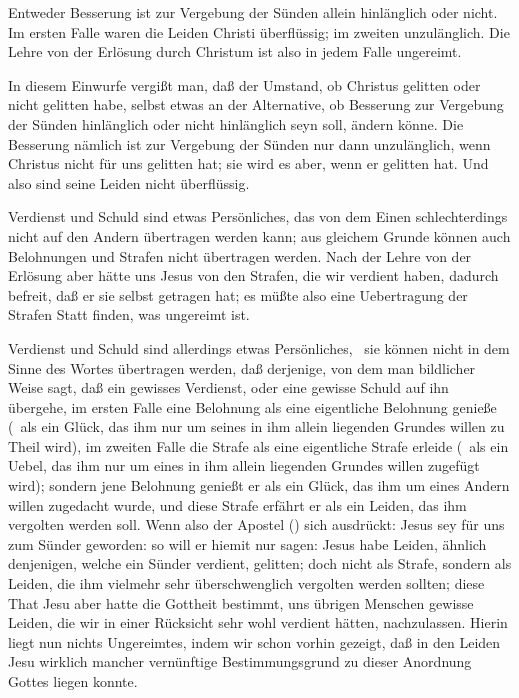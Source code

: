 \begin{aufza}
\begin{aufzb}
\begin{aufzc}
\end{aufzc}
\end{aufzb}
 Entweder Besserung ist zur Vergebung der Sünden allein hinlänglich oder nicht. Im ersten Falle waren die Leiden Christi überflüssig; im zweiten unzulänglich. Die Lehre von der Erlösung durch Christum ist also in jedem Falle ungereimt.\par
{} In diesem Einwurfe vergißt man, daß der Umstand, ob Christus gelitten oder nicht gelitten habe, selbst etwas an der Alternative, ob Besserung zur Vergebung der Sünden hinlänglich oder nicht hinlänglich seyn soll, ändern könne. Die Besserung nämlich ist zur Vergebung der Sünden nur dann unzulänglich, wenn Christus nicht für uns gelitten hat; sie wird es aber, wenn er gelitten hat. Und also sind seine Leiden nicht überflüssig.\par
{} Verdienst und Schuld sind etwas Persönliches, das von dem Einen schlechterdings nicht auf den Andern übertragen werden kann; aus gleichem Grunde können auch Belohnungen und Strafen nicht übertragen werden. Nach der Lehre von der Erlösung aber hätte uns Jesus von den Strafen, die wir verdient haben, dadurch befreit, daß er sie selbst getragen hat; es müßte also eine Uebertragung der Strafen Statt finden, was ungereimt ist.\par
{} Verdienst und Schuld sind allerdings etwas Persönliches, \dh\ sie können nicht in dem Sinne des Wortes übertragen werden, daß derjenige, von dem man bildlicher Weise sagt, daß ein gewisses Verdienst, oder eine gewisse Schuld auf ihn übergehe, im ersten Falle eine Belohnung als eine eigentliche Belohnung genieße (\dh\ als ein Glück, das ihm nur um seines in ihm allein liegenden Grundes willen zu Theil wird), im zweiten Falle die Strafe als eine eigentliche Strafe erleide (\dh\ als ein Uebel, das ihm nur um eines in ihm allein liegenden Grundes willen zugefügt wird); sondern jene Belohnung genießt er als ein Glück, das ihm um eines Andern willen zugedacht wurde, und diese Strafe erfährt er als ein Leiden, das ihm vergolten werden soll. Wenn also der Apostel () sich ausdrückt: Jesus sey für uns zum Sünder geworden: so will er hiemit nur sagen: Jesus habe Leiden, ähnlich denjenigen, welche ein Sünder verdient, gelitten; doch nicht als Strafe, sondern als Leiden, die ihm vielmehr sehr überschwenglich vergolten werden sollten; diese That Jesu aber hatte die Gottheit bestimmt, uns übrigen Menschen gewisse Leiden, die wir in einer Rücksicht sehr wohl verdient hätten, nachzulassen. Hierin liegt nun nichts Ungereimtes, indem wir schon vorhin gezeigt, daß in den Leiden Jesu wirklich mancher vernünftige Bestimmungsgrund zu dieser Anordnung Gottes liegen konnte.\par

\end{aufza}
